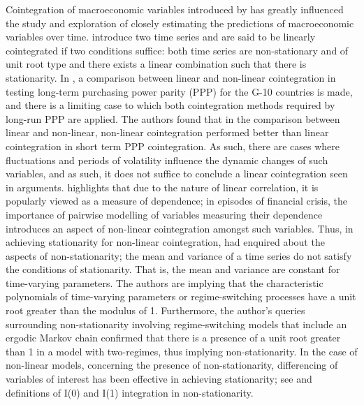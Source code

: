 \documentclass[a4paper]{article}
\theoremstyle{plain}
\theoremstyle{definition}
\theoremstyle{remark}
\begin{document}
Cointegration of macroeconomic variables introduced by \cite{granger1989} has greatly influenced the study and exploration of closely estimating the predictions of macroeconomic variables over time. 
\cite{karlsen2007nonparametric} introduce two time series and are said to be linearly cointegrated if two conditions suffice: both time series are non-stationary and of unit root type and there exists a linear combination such that there is stationarity. In \cite{haug2011linear}, a comparison between linear and non-linear cointegration in testing long-term purchasing power parity (PPP) for the G-10 countries is made, and there is a limiting case to which both cointegration methods required by long-run PPP are applied. The authors found that in the comparison between linear and non-linear, non-linear cointegration performed better than linear cointegration in short term PPP cointegration. As such, there are cases where fluctuations and periods of volatility influence the dynamic changes of such variables, and as such, it does not suffice to conclude a linear cointegration seen in \cite{dufrenot2012recent} arguments.
\newline
\cite{makatjane2024forecasting} highlights that due to the nature of linear correlation, it is popularly viewed as a measure of dependence; in episodes of financial crisis, the importance of pairwise modelling of variables measuring their dependence introduces an aspect of non-linear cointegration amongst such variables.
Thus, in achieving stationarity for non-linear cointegration, \cite{dufrenot2012recent} had enquired about the aspects of non-stationarity; the mean and variance of a time series do not satisfy the conditions of stationarity. That is, the mean and variance are constant for time-varying parameters. The authors are implying that the characteristic polynomials of time-varying parameters or regime-switching processes have a unit root greater than the modulus of 1. Furthermore, the author's queries surrounding non-stationarity involving regime-switching models that include an ergodic Markov chain confirmed that there is a presence of a unit root greater than 1 in a model with two-regimes, thus implying non-stationarity. In the case of non-linear models, concerning the presence of non-stationarity, differencing of variables of interest has been effective in achieving stationarity; see \cite{doi:10.1080/01621459.1934.10502683} and \cite{shi2016nonlinear} definitions of I(0) and I(1) integration in non-stationarity.
\end{document}
